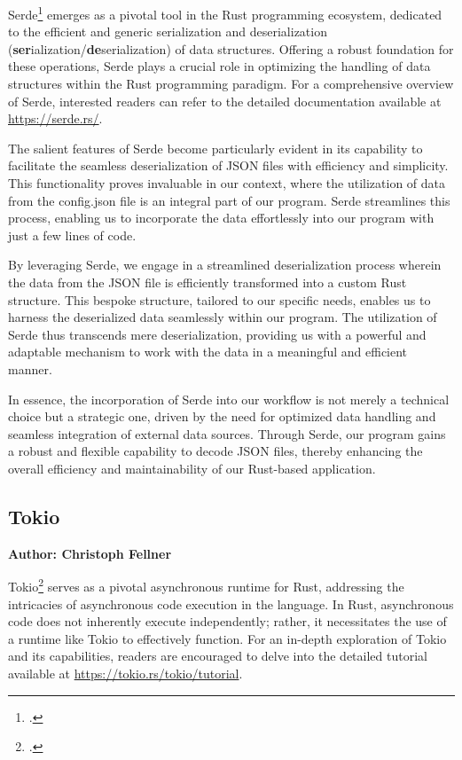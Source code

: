 Serde\footcite{serde} emerges as a pivotal tool in the Rust programming ecosystem, dedicated to the efficient and generic serialization and deserialization 
(\textbf{ser}ialization/\textbf{de}serialization) of data structures. Offering a robust foundation for these operations, Serde plays a crucial role in optimizing
the handling of data structures within the Rust programming paradigm. For a comprehensive overview of Serde, interested readers can refer to the detailed 
documentation available at \href{https://serde.rs/}{https://serde.rs/}.\newline

The salient features of Serde become particularly evident in its capability to facilitate the seamless deserialization of JSON files with efficiency and 
simplicity. This functionality proves invaluable in our context, where the utilization of data from the config.json file is an integral part of our program. 
Serde streamlines this process, enabling us to incorporate the data effortlessly into our program with just a few lines of code.\newline

By leveraging Serde, we engage in a streamlined deserialization process wherein the data from the JSON file is efficiently transformed into a custom Rust 
structure. This bespoke structure, tailored to our specific needs, enables us to harness the deserialized data seamlessly within our program. The utilization of
Serde thus transcends mere deserialization, providing us with a powerful and adaptable mechanism to work with the data in a meaningful and efficient manner.\newline

In essence, the incorporation of Serde into our workflow is not merely a technical choice but a strategic one, driven by the need for optimized data handling 
and seamless integration of external data sources. Through Serde, our program gains a robust and flexible capability to decode JSON files, thereby enhancing the
overall efficiency and maintainability of our Rust-based application.

\subsection{Tokio}
\textbf{Author: Christoph Fellner}

Tokio\footcite{tokio} serves as a pivotal asynchronous runtime for Rust, addressing the intricacies of asynchronous code execution in the language. In Rust, 
asynchronous code does not inherently execute independently; rather, it necessitates the use of a runtime like Tokio to effectively function. For an in-depth 
exploration of Tokio and its capabilities, readers are encouraged to delve into the detailed tutorial available at 
\href{https://tokio.rs/tokio/tutorial}{https://tokio.rs/tokio/tutorial}.\newline

